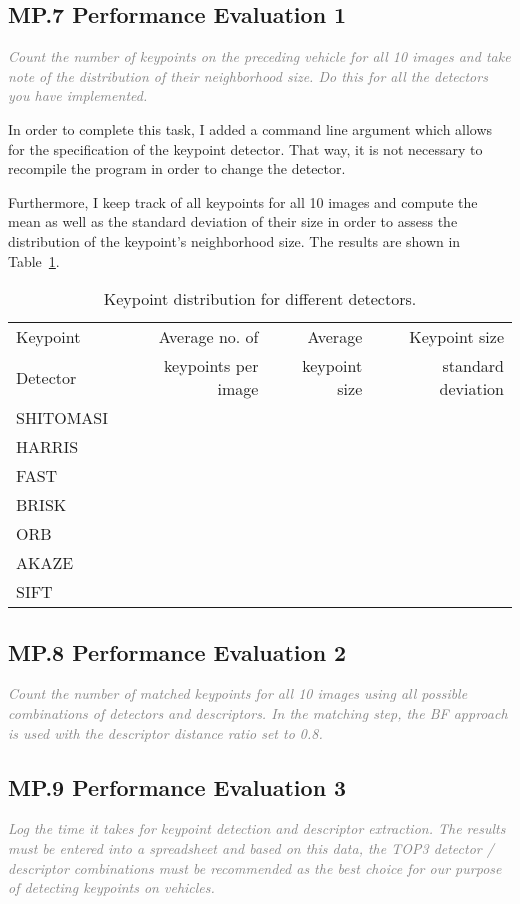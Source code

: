 \documentclass[a4paper]{scrartcl}
\begin{document}
\subsection*{MP.7 Performance Evaluation 1}
\textcolor{gray}{\textit{Count the number of keypoints on the preceding vehicle for all 10 images and take note of the distribution of their neighborhood size. Do this for all the detectors you have implemented.}}

In order to complete this task, I added a command line argument which allows for the
specification of the keypoint detector. That way, it is not necessary to recompile the program
in order to change the detector.

Furthermore, I keep track of all keypoints for all 10 images and compute the mean as well
as the standard deviation of their size in order to assess the distribution of the
keypoint's neighborhood size. The results are shown in Table~\ref{tab:performance_1}.

\begin{table}
	\caption{Keypoint distribution for different detectors.}
	\label{tab:performance_1}
	\begin{tabular}{l||r|r|r}
		Keypoint & Average no. of  		& Average  		& Keypoint size	\\
		Detector & keypoints per image 	& keypoint size 	& standard deviation 	\\
		\hline \hline
		SHITOMASI & & & \\
		HARRIS & & & \\
		FAST & & & \\
		BRISK & & & \\
		ORB & & & \\
		AKAZE & & & \\
		SIFT & & &
	\end{tabular}
\end{table}

\subsection*{MP.8 Performance Evaluation 2}
\textcolor{gray}{\textit{Count the number of matched keypoints for all 10 images using all possible combinations of detectors and descriptors. In the matching step, the BF approach is used with the descriptor distance ratio set to 0.8.}}


\subsection*{MP.9 Performance Evaluation 3}
\textcolor{gray}{\textit{Log the time it takes for keypoint detection and descriptor extraction. The results must be entered into a spreadsheet and based on this data, the TOP3 detector / descriptor combinations must be recommended as the best choice for our purpose of detecting keypoints on vehicles.}}
\end{document}
